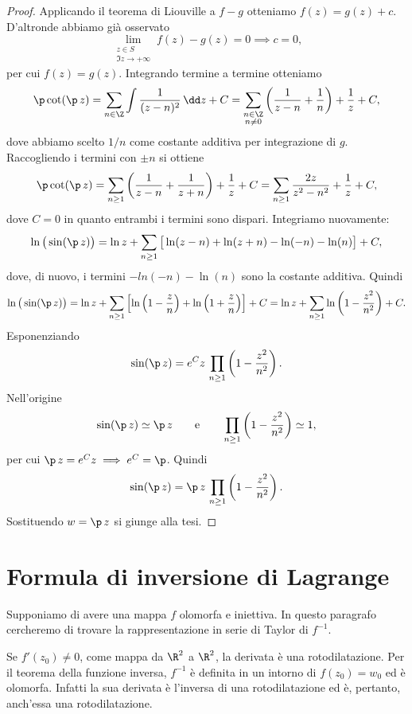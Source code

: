 \begin{proof}
	Applicando il teorema di Liouville a \(f-g\) otteniamo \(f(z)=g(z)+c\). D'altronde abbiamo già osservato
	\[
		\lim_{\substack{z\in S\\\Im z \to +\infty}} f(z)-g(z) = 0 \implies c=0,
	\]
	per cui \(f(z)=g(z)\). Integrando termine a termine otteniamo
	\[
		\p \cot(\p\,z) = \sum_{n\in \Z} \int \frac{1}{(z-n)^2}\,\dd z + C = \sum_{\substack{n\in \Z\\n\neq 0}} \left( \frac{1}{z-n}+\frac{1}{n} \right)+\frac{1}{z}+C,
	\]
	dove abbiamo scelto \(1/n\) come costante additiva per integrazione di \(g\). Raccogliendo i termini con \(\pm n\) si ottiene
	\[
		\p \cot(\p\,z) = \sum_{n\ge 1} \left( \frac{1}{z-n}+ \frac{1}{z+n} \right)+\frac{1}{z}+C = \sum_{n\ge 1} \frac{2z}{z^2-n^2} + \frac{1}{z}+C,
	\]
	dove \(C=0\) in quanto entrambi i termini sono dispari. Integriamo nuovamente:
	\[
		\ln\big(\sin(\p\,z)\big) = \ln z + \sum_{n \ge 1} \big[\ln(z-n)+\ln(z+n)-\ln(-n)-\ln(n)\big] + C,
	\]
	dove, di nuovo, i termini \(-ln(-n)-\ln(n)\) sono la costante additiva. Quindi
	\[
		\ln\big(\sin(\p\,z)\big) = \ln z + \sum_{n\ge 1} \left[ \ln \left( 1- \frac{z}{n} \right)+\ln \left( 1+ \frac{z}{n} \right) \right] +C = \ln z + \sum_{n\ge 1} \ln \left( 1- \frac{z^2}{n^2} \right)+C.
	\]
	Esponenziando
	\[
		\sin(\p\,z) = e^C z\,\prod_{n\ge 1} \left( 1- \frac{z^2}{n^2} \right).
	\]
	Nell'origine
	\[
		\sin(\p\,z) \simeq \p\,z \qquad\text{e}\qquad \prod_{n\ge 1} \left( 1- \frac{z^2}{n^2} \right) \simeq 1,
	\]
	per cui \(\p\,z = e^C z \implies e^C = \p\). Quindi
	\[
		\sin(\p\,z) = \p\,z\,\prod_{n\ge 1} \left( 1- \frac{z^2}{n^2} \right).
	\]
	Sostituendo \(w=\p\,z\) si giunge alla tesi.
\end{proof}
\section{Formula di inversione di Lagrange}

Supponiamo di avere una mappa \(f\) olomorfa e iniettiva. In questo paragrafo cercheremo di trovare la rappresentazione in serie di Taylor di \(f^{-1}\).

Se \(f'(z_0)\neq 0\), come mappa da \(\R^2\) a \(\R^2\), la derivata è una rotodilatazione.
Per il teorema della funzione inversa, \(f^{-1}\) è definita in un intorno di \(f(z_0)=w_0\) ed è olomorfa.
Infatti la sua derivata è l'inversa di una rotodilatazione ed è, pertanto, anch'essa una rotodilatazione.

